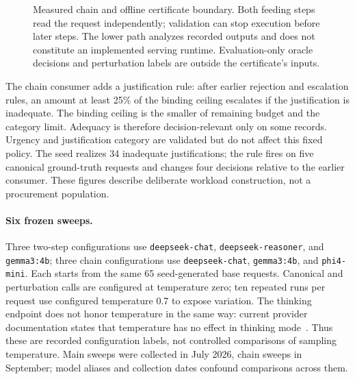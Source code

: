 \begin{figure}[t]
\centering

\caption{Measured chain and offline certificate boundary. Both feeding steps read the request independently; validation can stop execution before later steps. The lower path analyzes recorded outputs and does not constitute an implemented serving runtime. Evaluation-only oracle decisions and perturbation labels are outside the certificate's inputs.}
\label{fig:architecture}
\end{figure}

The chain consumer adds a justification rule: after earlier rejection and escalation rules, an amount at least 25\% of the binding ceiling escalates if the justification is inadequate. The binding ceiling is the smaller of remaining budget and the category limit. Adequacy is therefore decision-relevant only on some records. Urgency and justification category are validated but do not affect this fixed policy. The seed realizes 34 inadequate justifications; the rule fires on five canonical ground-truth requests and changes four decisions relative to the earlier consumer. These figures describe deliberate workload construction, not a procurement population.

\paragraph{Six frozen sweeps.}
Three two-step configurations use \texttt{deepseek-\allowbreak chat}, \texttt{deepseek-\allowbreak reasoner}, and \texttt{gemma3:4b}; three chain configurations use \texttt{deepseek-\allowbreak chat}, \texttt{gemma3:4b}, and \texttt{phi4-mini}. Each starts from the same 65 seed-generated base requests. Canonical and perturbation calls are configured at temperature zero; ten repeated runs per request use configured temperature 0.7 to expose variation. The thinking endpoint does not honor temperature in the same way: current provider documentation states that temperature has no effect in thinking mode~\cite{deepseek}. Thus these are recorded configuration labels, not controlled comparisons of sampling temperature. Main sweeps were collected in July 2026, chain sweeps in September; model aliases and collection dates confound comparisons across them.

